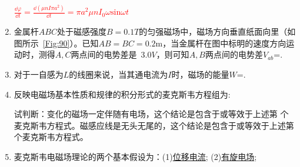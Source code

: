 \begin{enumerate}
    \begin{note}
        \textcolor{red}{$\frac{\dd \varphi}{\dd t}=\frac{\dd(\mu n I \pi a^2)}{\dd t}=\pi a^2 \mu n I_0 \omega \mathrm{sin} \omega t$}
    \end{note}
    \item 金属杆$ABC$处于磁感强度$B=0.1 T$的匀强磁场中，磁场方向垂直纸面向里（如图所示~\ref{Fig:90}）。已知$AB=BC=0.2 \mathrm{m}$，当金属杆在图中标明的速度方向运动时，测得$A,C$两点间的电势差是~$3.0V$，则可知$A,B$两点间的电势差$V_{ab}$=.
    \item 对于一自感为$L$的线圈来说，当其通电流为$I$时，磁场的能量$W$=.
    \item 反映电磁场基本性质和规律的积分形式的麦克斯韦方程组为:
    \par
    试判断：变化的磁场一定伴随有电场，这个结论是包含于或等效于上述第\underline{} 个麦克斯韦方程式。磁感应线是无头无尾的，这个结论是包含于或等效于上述第\\
     个麦克斯韦方程式。
    \item 麦克斯韦电磁场理论的两个基本假设为：(1)\underline{位移电流};  (2)\underline{有旋电场};
\end{enumerate}
